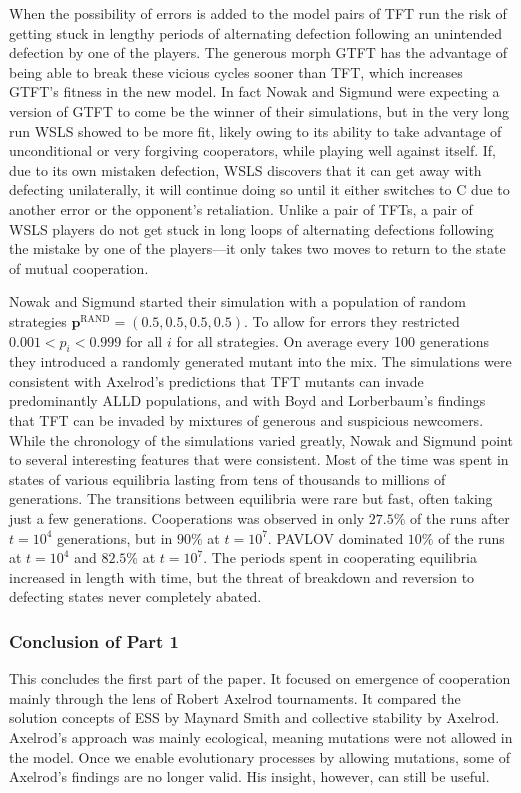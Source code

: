 When the possibility of errors is added to the model pairs of TFT run the risk of getting stuck in lengthy periods of alternating defection following an unintended defection by one of the players. The generous morph GTFT has the advantage of being able to break these vicious cycles sooner than TFT, which increases GTFT's fitness in the new model. In fact Nowak and Sigmund were expecting a version of GTFT to come be the winner of their simulations, but in the very long run WSLS showed to be more fit, likely owing to its ability to take advantage of unconditional or very forgiving cooperators, while playing well against itself. If, due to its own mistaken defection, WSLS discovers that it can get away with defecting unilaterally, it will continue doing so until it either switches to C due to another error or the opponent's retaliation. Unlike a pair of TFTs, a pair of WSLS players do not get stuck in long loops of alternating defections following the mistake by one of the players---it only takes two moves to return to the state of mutual cooperation.

Nowak and Sigmund started their simulation with a population of random strategies $\mathbf{p}^{\textrm{RAND}} = (0.5, 0.5, 0.5, 0.5)$. To allow for errors they restricted $0.001 < p_i < 0.999$ for all $i$ for all strategies. On average every 100 generations they introduced a randomly generated mutant into the mix. The simulations were consistent with Axelrod's predictions that TFT mutants can invade predominantly ALLD populations, and with Boyd and Lorberbaum's findings that TFT can be invaded by mixtures of generous and suspicious newcomers. While the chronology of the simulations varied greatly, Nowak and Sigmund point to several interesting features that were consistent. Most of the time was spent in states of various equilibria lasting from tens of thousands to millions of generations. The transitions between equilibria were rare but fast, often taking just a few generations. Cooperations was observed in only $27.5\%$ of the runs after $t = 10^4$ generations, but in $90\%$ at $t=10^7$. PAVLOV dominated $10\%$ of the runs at $t = 10^4$ and $82.5\%$ at $t=10^7$. The periods spent in cooperating equilibria increased in length with time, but the threat of breakdown and reversion to defecting states never completely abated.

\subsubsection{Conclusion of Part 1}
This concludes the first part of the paper. It focused on emergence of cooperation mainly through the lens of Robert Axelrod tournaments. It compared the solution concepts of ESS by Maynard Smith and collective stability by Axelrod. Axelrod's approach was mainly ecological, meaning mutations were not allowed in the model. Once we enable evolutionary processes by allowing mutations, some of Axelrod's findings are no longer valid. His insight, however, can still be useful.

